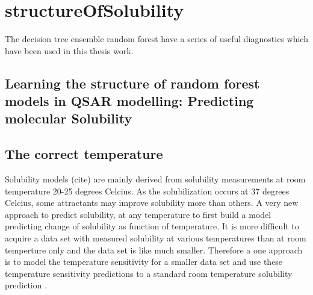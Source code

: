\chapter{structureOfSolubility}

The decision tree ensemble random forest have a series of useful diagnostics which have been used in this thesis work.

\section{Learning the structure of random forest models in QSAR
modelling: Predicting molecular Solubility}
\label{article:solubility}



\section{The correct temperature}
Solubility models (cite) are mainly derived from solubility measurements at room temperature 20-25 degrees Celcius. As the solubilization occurs at 37 degrees Celcius, some attractants may improve solubility more than others. A very new approach to predict solubility, at any temperature to first build a model predicting change of solubility as function of temperature. It is more difficult to acquire a data set with measured solubility at various temperatures than at room temperture only and the data set is like much smaller. Therefore a one approach is to model the temperature sensitivity for a smaller data set and use these temperature sensitivity predictions to a standard room temperature solubility prediction \cite{klimenko2016novel}.